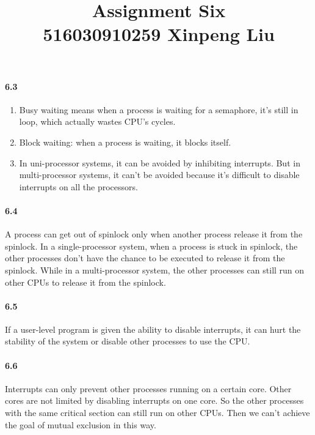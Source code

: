 \documentclass[12pt,a4]{article}
\date{}
\title{
	Assignment Six\\
	\vspace{3mm}
	{\normalsize 516030910259 \textbf{Xinpeng Liu}}
}
\begin{document}
    \maketitle
	\paragraph{6.3} 
		\begin{enumerate}
			\item Busy waiting means when a process is waiting for a semaphore, it's still in loop, which actually wastes CPU's cycles.
			\item Block waiting: when a process is waiting, it blocks itself.
			\item In uni-processor systems, it can be avoided by inhibiting interrupts. But in multi-processor systems, it can't be avoided because it's difficult to disable interrupts on all the processors.
		\end{enumerate}
	\paragraph{6.4} 
		A process can get out of spinlock only when another process release it from the spinlock. In a single-processor system, when a process is stuck in spinlock, the other processes don't have the chance to be executed to release it from the spinlock. While in a multi-processor system, the other processes can still run on other CPUs to release it from the spinlock. 
	\paragraph{6.5} 
		If a user-level program is given the ability to disable interrupts, it can hurt the stability of the system or disable other processes to use the CPU.
	\paragraph{6.6}
		Interrupts can only prevent other processes running on a certain core. Other cores are not limited by disabling interrupts on one core. So the other processes with the same critical section can still run on other CPUs. Then we can't achieve the goal of mutual exclusion in this way.
\end{document}
